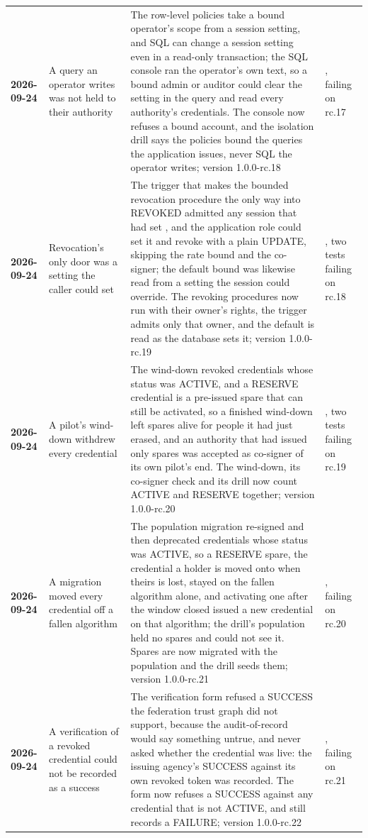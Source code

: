 {\begin{xltabular}{\textwidth}{>{\bfseries\hspace{0pt}}p{0.62in} >{\RaggedRight\arraybackslash\hspace{0pt}}X >{\RaggedRight\arraybackslash\hspace{0pt}}X >{\RaggedRight\arraybackslash\hspace{0pt}}p{1.6in}}
2026-09-24 & A query an operator writes was not held to their authority & The row-level policies take a bound operator's scope from a session setting, and SQL can change a session setting even in a read-only transaction; the SQL console ran the operator's own text, so a bound admin or auditor could clear the setting in the query and read every authority's credentials. The console now refuses a bound account, and the isolation drill says the policies bound the queries the application issues, never SQL the operator writes; version 1.0.0-rc.18 & , failing on rc.17 \\
2026-09-24 & Revocation's only door was a setting the caller could set & The trigger that makes the bounded revocation procedure the only way into REVOKED admitted any session that had set , and the application role could set it and revoke with a plain UPDATE, skipping the rate bound and the co-signer; the default bound was likewise read from a setting the session could override. The revoking procedures now run with their owner's rights, the trigger admits only that owner, and the default is read as the database sets it; version 1.0.0-rc.19 & , two tests failing on rc.18 \\
2026-09-24 & A pilot's wind-down withdrew every credential & The wind-down revoked credentials whose status was ACTIVE, and a RESERVE credential is a pre-issued spare that can still be activated, so a finished wind-down left spares alive for people it had just erased, and an authority that had issued only spares was accepted as co-signer of its own pilot's end. The wind-down, its co-signer check and its drill now count ACTIVE and RESERVE together; version 1.0.0-rc.20 & , two tests failing on rc.19 \\
2026-09-24 & A migration moved every credential off a fallen algorithm & The population migration re-signed and then deprecated credentials whose status was ACTIVE, so a RESERVE spare, the credential a holder is moved onto when theirs is lost, stayed on the fallen algorithm alone, and activating one after the window closed issued a new credential on that algorithm; the drill's population held no spares and could not see it. Spares are now migrated with the population and the drill seeds them; version 1.0.0-rc.21 & , failing on rc.20 \\
2026-09-24 & A verification of a revoked credential could not be recorded as a success & The verification form refused a SUCCESS the federation trust graph did not support, because the audit-of-record would say something untrue, and never asked whether the credential was live: the issuing agency's SUCCESS against its own revoked token was recorded. The form now refuses a SUCCESS against any credential that is not ACTIVE, and still records a FAILURE; version 1.0.0-rc.22 & , failing on rc.21 \\

\end{xltabular}}
